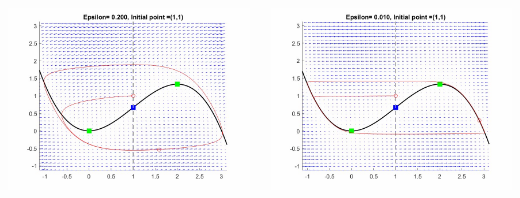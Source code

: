 \documentclass[15pt, a0paper, portrait]{tikzposter}
\begin{document}
\begin{columns}
	{
		
		\begin{tikzfigure}[h!]
			\centering
			\includegraphics[height=10cm,width=13cm]{Posterpic1.jpg}
		\end{tikzfigure}
	}
	{
		\begin{tikzfigure}[h!]
			\centering
			\includegraphics[height=10cm,width=13cm]{Posterpic2.jpg}
	\end{tikzfigure}}
\end{columns}
\end{document}
